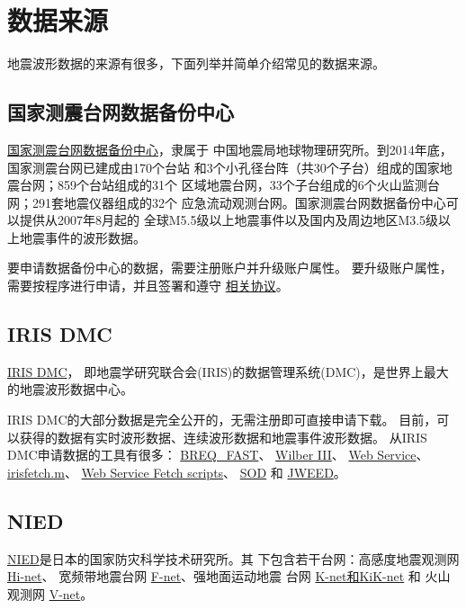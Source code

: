 \section{数据来源}
地震波形数据的来源有很多，下面列举并简单介绍常见的数据来源。

\subsection{国家测震台网数据备份中心}
\href{http://www.seisdmc.ac.cn/}{国家测震台网数据备份中心}，隶属于
中国地震局地球物理研究所。到2014年底，国家测震台网已建成由170个台站
和3个小孔径台阵（共30个子台）组成的国家地震台网；859个台站组成的31个
区域地震台网，33个子台组成的6个火山监测台网；291套地震仪器组成的32个
应急流动观测台网。国家测震台网数据备份中心可以提供从2007年8月起的
全球M5.5级以上地震事件以及国内及周边地区M3.5级以上地震事件的波形数据。

要申请数据备份中心的数据，需要注册账户并升级账户属性。
要升级账户属性，需要按程序进行申请，并且签署和遵守
\href{http://www.seisdmc.ac.cn/class/view?id=8}{相关协议}。

\subsection{IRIS DMC}
\label{subsec:IRIS}
\href{http://ds.iris.edu/ds/nodes/dmc/}{IRIS DMC}，
即地震学研究联合会(IRIS)的数据管理系统(DMC)，是世界上最大的地震波形数据中心。

IRIS DMC的大部分数据是完全公开的，无需注册即可直接申请下载。
目前，可以获得的数据有实时波形数据、连续波形数据和地震事件波形数据。
从IRIS DMC申请数据的工具有很多：
\href{https://ds.iris.edu/ds/nodes/dmc/manuals/breq_fast/}{BREQ\_FAST}、
\href{http://ds.iris.edu/wilber3/find_event}{Wilber III}、
\href{http://service.iris.edu/}{Web Service}、
\href{http://ds.iris.edu/ds/nodes/dmc/software/downloads/irisfetch.m/}{irisfetch.m}、
\href{https://seiscode.iris.washington.edu/projects/ws-fetch-scripts}{Web Service Fetch scripts}、
\href{http://www.seis.sc.edu/sod/}{SOD} 和
\href{https://ds.iris.edu/ds/nodes/dmc/software/downloads/jweed/}{JWEED}。

\subsection{NIED}
\label{subsec:NIED}
\href{http://www.bosai.go.jp/}{NIED}是日本的国家防灾科学技术研究所。其
下包含若干台网：高感度地震观测网 \href{http://www.hinet.bosai.go.jp/}{Hi-net}、
宽频带地震台网 \href{http://www.fnet.bosai.go.jp/}{F-net}、强地面运动地震
台网 \href{http://www.kyoshin.bosai.go.jp/}{K-net和KiK-net} 和
火山观测网 \href{http://www.vnet.bosai.go.jp/}{V-net}。


